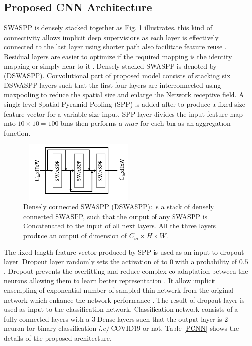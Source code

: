 \subsection{Proposed CNN Architecture}
SWASPP is densely stacked \cite{huang2017densely} together as Fig. \ref{denseB} illustrates. this kind of connectivity allows implicit deep supervisions as each layer is effectively connected to the last layer using shorter path also facilitate feature reuse \cite{huang2017densely}. Residual layers are easier to optimize if the required mapping is the identity mapping or simply near to it \cite{he2016deep}. Densely stacked SWASPP is denoted by (DSWASPP). Convolutional part of proposed model consists of stacking six DSWASPP layers such that the first four layers are interconnected using maxpooling to reduce the spatial size and enlarge the Network receptive field. A single level Spatial Pyramid Pooling (SPP) \cite{he2015spatial} is added after to produce a fixed size feature vector for a variable size input. SPP layer divides the input feature map into $10\times 10 = 100$ bins then performs a $max$ for each bin as an aggregation function. 
\begin{center}
\begin{figure}[htbp]
\centerline{\includegraphics[height=30mm,width=6cm]{Figures/DensResd.PNG}}
\caption{Densely connected SWASPP (DSWASPP): is a stack of densely connected SWASPP, such that the output of any SWASPP is Concatenated to the input of all next layers. All the three layers produce an output of dimension of $C_{in} \times H \times W$.}
\label{denseB}
\end{figure}
\end{center}
The fixed length feature vector produced by SPP is used as an input to dropout \cite{srivastava2014dropout} layer. Dropout layer randomly sets the activation of to $0$ with a probability of $0.5$. Dropout prevents the overfitting and reduce complex co-adaptation between the neurons allowing them to learn better representation \cite{srivastava2014dropout}. It allow implicit ensempling of exponential number of sampled thin network from the original network which enhance the network performance \cite{srivastava2014dropout}. The result of dropout layer is used as input to the classification network. Classification network consists of a fully connected layers with a $3$ Dense layers such that the output layer is 2-neuron for binary classification \textit{i.e)} COVID19 or not. Table \ref{PCNN} shows the details of the proposed architecture.


